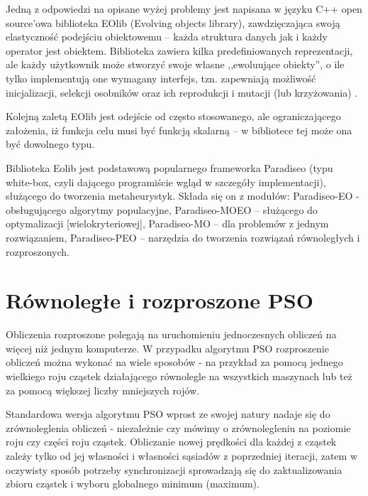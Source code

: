 \documentclass[12pt, twoside, openany, abstract=on]{report}
\theoremstyle{definition}
\begin{document}
Jedną z odpowiedzi na opisane wyżej problemy jest napisana w języku C++ open source’owa biblioteka EOlib (Evolving objects library), zawdzięczająca swoją elastyczność podejściu obiektowemu – każda struktura danych jak i każdy operator jest obiektem. Biblioteka zawiera kilka predefiniowanych reprezentacji, ale każdy użytkownik może stworzyć swoje własne ,,ewoluujące obiekty'', o ile tylko implementują one wymagany interfejs, tzn. zapewniają możliwość inicjalizacji, selekcji osobników oraz ich reprodukcji i mutacji (lub krzyżowania) 
. 

Kolejną zaletą EOlib jest odejście od często stosowanego, ale ograniczającego założenia, iż funkcja celu musi być funkcją skalarną – w bibliotece tej może ona być dowolnego typu.

Biblioteka Eolib jest podstawową popularnego frameworka Paradiseo (typu white-box, czyli dającego programiście wgląd w szczegóły implementacji), służącego do tworzenia metaheurystyk.
Składa się on z modułów: Paradiseo-EO -  obsługującego algorytmy populacyjne, Paradiseo-MOEO – służącego do optymalizacji [wielokryteriowej], Paradiseo-MO – dla problemów z jednym rozwiązaniem, Paradiseo-PEO – narzędzia do tworzenia rozwiązań równoległych i rozproszonych.


\section{Równoległe i rozproszone PSO}

Obliczenia rozproszone polegają na uruchomieniu jednoczesnych obliczeń na więcej niż jednym komputerze. W przypadku algorytmu PSO rozproszenie obliczeń można wykonać na wiele sposobów - na przykład za pomocą jednego wielkiego roju cząstek działającego równolegle na wszystkich maszynach lub też za pomocą większej liczby mniejszych rojów.  



Standardowa wersja algorytmu PSO wprost ze swojej natury nadaje się do zrównoleglenia obliczeń - niezależnie czy mówimy o zrównolegleniu na poziomie roju czy części roju cząstek.
Obliczanie nowej prędkości dla każdej z cząstek zależy tylko od jej własności i własności sąsiadów z poprzedniej iteracji, zatem w oczywisty sposób potrzeby synchronizacji sprowadzają się do zaktualizowania zbioru cząstek 
 i wyboru globalnego minimum (maximum). 
\end{document}
